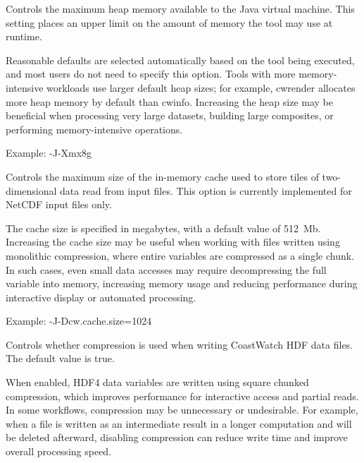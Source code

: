 \begin{description}[style=nextline]

\item[{\file -J-XmxSIZE}] 

Controls the maximum heap memory available to the Java virtual machine. This
setting places an upper limit on the amount of memory the tool may use at
runtime.

Reasonable defaults are selected automatically based on the tool being
executed, and most users do not need to specify this option. Tools with
more memory-intensive workloads use larger default heap sizes; for example,
{\file cwrender} allocates more heap memory by default than {\file cwinfo}.
Increasing the heap size may be beneficial when processing very large datasets,
building large composites, or performing memory-intensive operations.

Example: {\file -J-Xmx8g}

\item[{\file -J-Dcw.cache.size=SIZE}] 

Controls the maximum size of the in-memory cache used to store tiles of
two-dimensional data read from input files. This option is currently implemented
for NetCDF input files only.

The cache size is specified in megabytes, with a default value of 512~Mb.
Increasing the cache size may be useful when working with files written using
monolithic compression, where entire variables are compressed as a single chunk.
In such cases, even small data accesses may require decompressing the full
variable into memory, increasing memory usage and reducing performance during
interactive display or automated processing.

Example: {\file -J-Dcw.cache.size=1024}

\item[{\file -J-Dcw.compress.mode=true$|$false}] 

Controls whether compression is used when writing CoastWatch HDF data files.
The default value is {\file true}.

When enabled, HDF4 data variables are written using square chunked compression,
which improves performance for interactive access and partial reads. In some
workflows, compression may be unnecessary or undesirable. For example, when a
file is written as an intermediate result in a longer computation and will be
deleted afterward, disabling compression can reduce write time and improve
overall processing speed.


\end{description}
